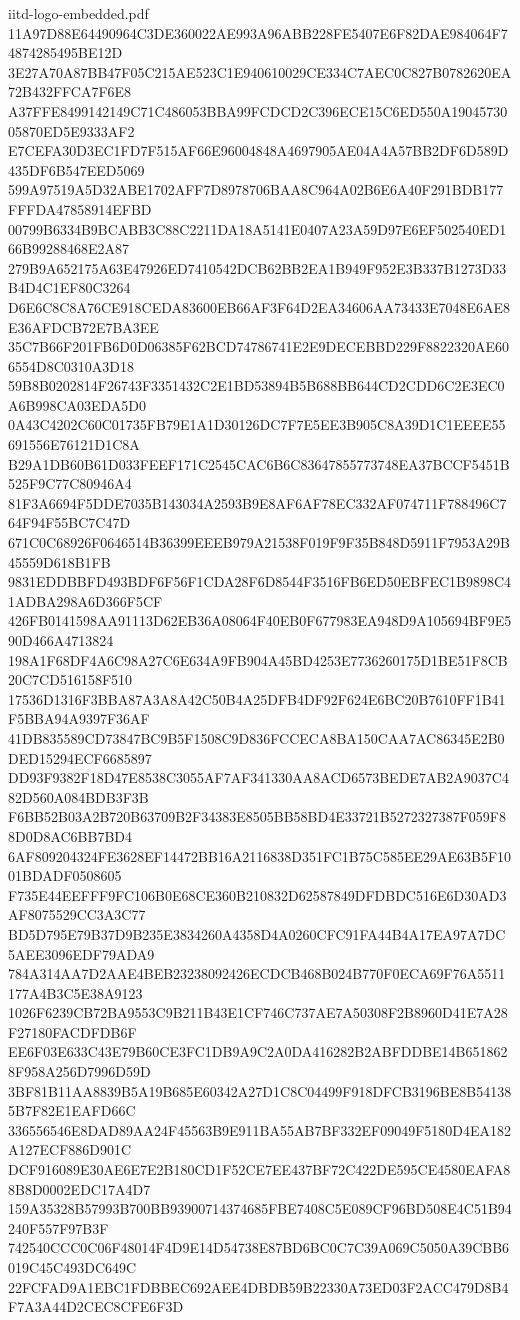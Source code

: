 \begin{filecontents*}[overwrite]{iitd-logo-embedded.pdf}
11A97D88E64490964C3DE360022AE993A96ABB228FE5407E6F82DAE984064F74874285495BE12D
3E27A70A87BB47F05C215AE523C1E940610029CE334C7AEC0C827B0782620EA72B432FFCA7F6E8
A37FFE8499142149C71C486053BBA99FCDCD2C396ECE15C6ED550A1904573005870ED5E9333AF2
E7CEFA30D3EC1FD7F515AF66E96004848A4697905AE04A4A57BB2DF6D589D435DF6B547EED5069
599A97519A5D32ABE1702AFF7D8978706BAA8C964A02B6E6A40F291BDB177FFFDA47858914EFBD
00799B6334B9BCABB3C88C2211DA18A5141E0407A23A59D97E6EF502540ED166B99288468E2A87
279B9A652175A63E47926ED7410542DCB62BB2EA1B949F952E3B337B1273D33B4D4C1EF80C3264
D6E6C8C8A76CE918CEDA83600EB66AF3F64D2EA34606AA73433E7048E6AE8E36AFDCB72E7BA3EE
35C7B66F201FB6D0D06385F62BCD74786741E2E9DECEBBD229F8822320AE606554D8C0310A3D18
59B8B0202814F26743F3351432C2E1BD53894B5B688BB644CD2CDD6C2E3EC0A6B998CA03EDA5D0
0A43C4202C60C01735FB79E1A1D30126DC7F7E5EE3B905C8A39D1C1EEEE55691556E76121D1C8A
B29A1DB60B61D033FEEF171C2545CAC6B6C83647855773748EA37BCCF5451B525F9C77C80946A4
81F3A6694F5DDE7035B143034A2593B9E8AF6AF78EC332AF074711F788496C764F94F55BC7C47D
671C0C68926F0646514B36399EEEB979A21538F019F9F35B848D5911F7953A29B45559D618B1FB
9831EDDBBFD493BDF6F56F1CDA28F6D8544F3516FB6ED50EBFEC1B9898C41ADBA298A6D366F5CF
426FB0141598AA91113D62EB36A08064F40EB0F677983EA948D9A105694BF9E590D466A4713824
198A1F68DF4A6C98A27C6E634A9FB904A45BD4253E7736260175D1BE51F8CB20C7CD516158F510
17536D1316F3BBA87A3A8A42C50B4A25DFB4DF92F624E6BC20B7610FF1B41F5BBA94A9397F36AF
41DB835589CD73847BC9B5F1508C9D836FCCECA8BA150CAA7AC86345E2B0DED15294ECF6685897
DD93F9382F18D47E8538C3055AF7AF341330AA8ACD6573BEDE7AB2A9037C482D560A084BDB3F3B
F6BB52B03A2B720B63709B2F34383E8505BB58BD4E33721B5272327387F059F88D0D8AC6BB7BD4
6AF809204324FE3628EF14472BB16A2116838D351FC1B75C585EE29AE63B5F1001BDADF0508605
F735E44EEFFF9FC106B0E68CE360B210832D62587849DFDBDC516E6D30AD3AF8075529CC3A3C77
BD5D795E79B37D9B235E3834260A4358D4A0260CFC91FA44B4A17EA97A7DC5AEE3096EDF79ADA9
784A314AA7D2AAE4BEB23238092426ECDCB468B024B770F0ECA69F76A5511177A4B3C5E38A9123
1026F6239CB72BA9553C9B211B43E1CF746C737AE7A50308F2B8960D41E7A28F27180FACDFDB6F
EE6F03E633C43E79B60CE3FC1DB9A9C2A0DA416282B2ABFDDBE14B6518628F958A256D7996D59D
3BF81B11AA8839B5A19B685E60342A27D1C8C04499F918DFCB3196BE8B541385B7F82E1EAFD66C
336556546E8DAD89AA24F45563B9E911BA55AB7BF332EF09049F5180D4EA182A127ECF886D901C
DCF916089E30AE6E7E2B180CD1F52CE7EE437BF72C422DE595CE4580EAFA88B8D0002EDC17A4D7
159A35328B57993B700BB93900714374685FBE7408C5E089CF96BD508E4C51B94240F557F97B3F
742540CCC0C06F48014F4D9E14D54738E87BD6BC0C7C39A069C5050A39CBB6019C45C493DC649C
22FCFAD9A1EBC1FDBBEC692AEE4DBDB59B22330A73ED03F2ACC479D8B4F7A3A44D2CEC8CFE6F3D

\end{filecontents*}
